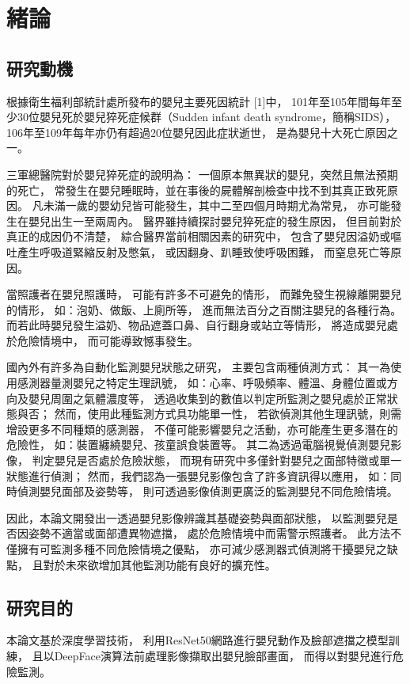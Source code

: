 \documentclass[class=NCU_thesis, crop=false]{standalone}
\begin{document}
\chapter{緒論}
\section{研究動機}
根據衛生福利部統計處所發布的嬰兒主要死因統計 [1]中，
101年至105年間每年至少30位嬰兒死於嬰兒猝死症候群（Sudden infant death syndrome，簡稱SIDS），
106年至109年每年亦仍有超過20位嬰兒因此症狀逝世，
是為嬰兒十大死亡原因之一。

三軍總醫院對於嬰兒猝死症的說明為：
一個原本無異狀的嬰兒，突然且無法預期的死亡，
常發生在嬰兒睡眠時，並在事後的屍體解剖檢查中找不到其真正致死原因。
凡未滿一歲的嬰幼兒皆可能發生，其中二至四個月時期尤為常見，
亦可能發生在嬰兒出生一至兩周內。
醫界雖持續探討嬰兒猝死症的發生原因，
但目前對於真正的成因仍不清楚，
綜合醫界當前相關因素的研究中，
包含了嬰兒因溢奶或嘔吐產生呼吸道緊縮反射及憋氣，
或因翻身、趴睡致使呼吸困難，
而窒息死亡等原因。

當照護者在嬰兒照護時，
可能有許多不可避免的情形，
而難免發生視線離開嬰兒的情形，
如：泡奶、做飯、上廁所等，
進而無法百分之百關注嬰兒的各種行為。
而若此時嬰兒發生溢奶、物品遮蓋口鼻、自行翻身或站立等情形，
將造成嬰兒處於危險情境中，
而可能導致憾事發生。

國內外有許多為自動化監測嬰兒狀態之研究，
主要包含兩種偵測方式：
其一為使用感測器量測嬰兒之特定生理訊號，
如：心率、呼吸頻率、體溫、身體位置或方向及嬰兒周圍之氣體濃度等，
透過收集到的數值以判定所監測之嬰兒處於正常狀態與否；
然而，使用此種監測方式具功能單一性，
若欲偵測其他生理訊號，則需增設更多不同種類的感測器，
不僅可能影響嬰兒之活動，亦可能產生更多潛在的危險性，
如：裝置纏繞嬰兒、孩童誤食裝置等。
其二為透過電腦視覺偵測嬰兒影像，
判定嬰兒是否處於危險狀態，
而現有研究中多僅針對嬰兒之面部特徵或單一狀態進行偵測；
然而，我們認為一張嬰兒影像包含了許多資訊得以應用，
如：同時偵測嬰兒面部及姿勢等，
則可透過影像偵測更廣泛的監測嬰兒不同危險情境。

因此，本論文開發出一透過嬰兒影像辨識其基礎姿勢與面部狀態，
以監測嬰兒是否因姿勢不適當或面部遭異物遮擋，
處於危險情境中而需警示照護者。
此方法不僅擁有可監測多種不同危險情境之優點，
亦可減少感測器式偵測將干擾嬰兒之缺點，
且對於未來欲增加其他監測功能有良好的擴充性。

\section{研究目的}
本論文基於深度學習技術，
利用ResNet50網路進行嬰兒動作及臉部遮擋之模型訓練，
且以DeepFace演算法前處理影像擷取出嬰兒臉部畫面，
而得以對嬰兒進行危險監測。
\end{document}
